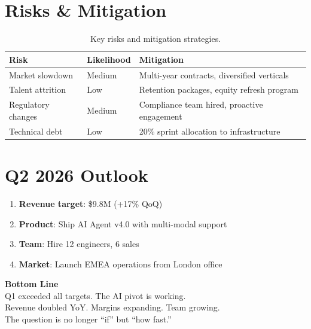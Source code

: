 \documentclass[11pt,a4paper]{article}
\begin{document}
\section{Risks \& Mitigation}

\begin{table}[H]
    \centering
    \caption{Key risks and mitigation strategies.}
    \begin{tabularx}{\textwidth}{l l X}
        \toprule
        \textbf{Risk} & \textbf{Likelihood} & \textbf{Mitigation} \\
        \midrule
        Market slowdown & Medium & Multi-year contracts, diversified verticals \\
        Talent attrition & Low & Retention packages, equity refresh program \\
        Regulatory changes & Medium & Compliance team hired, proactive engagement \\
        Technical debt & Low & 20\% sprint allocation to infrastructure \\
        \bottomrule
    \end{tabularx}
\end{table}

\section{Q2 2026 Outlook}

\begin{enumerate}
    \item \textbf{Revenue target}: \$9.8M (+17\% QoQ)
    \item \textbf{Product}: Ship AI Agent v4.0 with multi-modal support
    \item \textbf{Team}: Hire 12 engineers, 6 sales
    \item \textbf{Market}: Launch EMEA operations from London office
\end{enumerate}

\vspace{1cm}
\begin{center}
\colorbox{brand!10}{%
\begin{minipage}{0.9\textwidth}
\vspace{0.5cm}
\centering
\textcolor{brand}{\Large\textbf{Bottom Line}}\\[0.3cm]
\large Q1 exceeded all targets. The AI pivot is working.\\Revenue doubled YoY. Margins expanding. Team growing.\\The question is no longer ``if'' but ``how fast.''
\vspace{0.5cm}
\end{minipage}%
}
\end{center}
\end{document}
